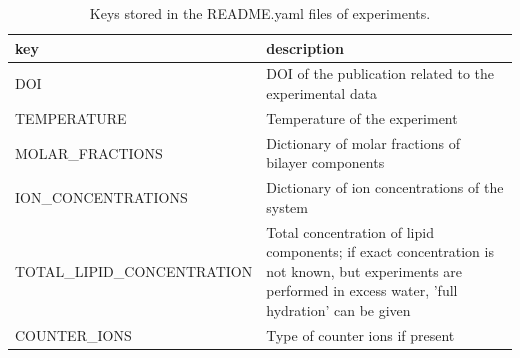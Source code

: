 \documentclass[fleqn,10pt]{wlscirepSI}
\begin{document}


\begin{table}[h]
    \centering
    \begin{tabular}{  p{5.0cm}  p{10.0cm}}
    \toprule
    key & description \\
    \midrule
    DOI & DOI of the publication related to the experimental data \\
    TEMPERATURE & Temperature of the experiment \\
    MOLAR\_FRACTIONS & Dictionary of molar fractions of bilayer components \\
    ION\_CONCENTRATIONS & Dictionary of ion concentrations of the system \\
    TOTAL\_LIPID\_CONCENTRATION & Total concentration of lipid components; if exact concentration is not known, but experiments are performed in excess water, 'full hydration' can be given \\
    COUNTER\_IONS & Type of counter ions if present
\end{tabular}
    \caption{Keys stored in the README.yaml files of experiments.}
    \label{tab:READMEkeysEXP}
\end{table}
\end{document}
